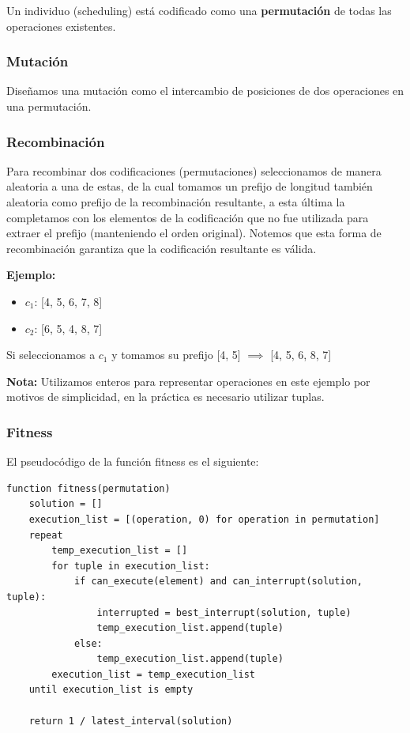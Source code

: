 \documentclass[14pt]{extarticle}
\begin{document}
Un individuo (scheduling) está codificado como una \textbf{permutación} de todas las operaciones existentes.

\subsubsection*{Mutación}

Diseñamos una mutación como el intercambio de posiciones de dos operaciones en una permutación.

\subsubsection*{Recombinación}

Para recombinar dos codificaciones (permutaciones) seleccionamos de manera aleatoria a una de estas, de la cual tomamos un prefijo de longitud también aleatoria como prefijo de la recombinación resultante, a esta última la completamos con los elementos de la codificación que no fue utilizada para extraer el prefijo (manteniendo el orden original). Notemos que esta forma de recombinación garantiza que la codificación resultante es válida.

\textbf{Ejemplo:}

\begin{itemize}
    \item $c_1$: [4, 5, 6, 7, 8]
    \item $c_2$: [6, 5, 4, 8, 7]
\end{itemize}

Si seleccionamos a $c_1$ y tomamos su prefijo [4, 5] $\implies$ [4, 5, 6, 8, 7]

\textbf{Nota:} Utilizamos enteros para representar operaciones en este ejemplo por motivos de simplicidad, en la práctica es necesario utilizar tuplas.

\subsubsection*{Fitness}

El pseudocódigo de la función fitness es el siguiente:

\begin{verbatim}
function fitness(permutation)
    solution = []
    execution_list = [(operation, 0) for operation in permutation]
    repeat
        temp_execution_list = []
        for tuple in execution_list:
            if can_execute(element) and can_interrupt(solution, tuple):
                interrupted = best_interrupt(solution, tuple)
                temp_execution_list.append(tuple)
            else:
                temp_execution_list.append(tuple)
        execution_list = temp_execution_list
    until execution_list is empty

    return 1 / latest_interval(solution)
\end{verbatim}
\end{document}
